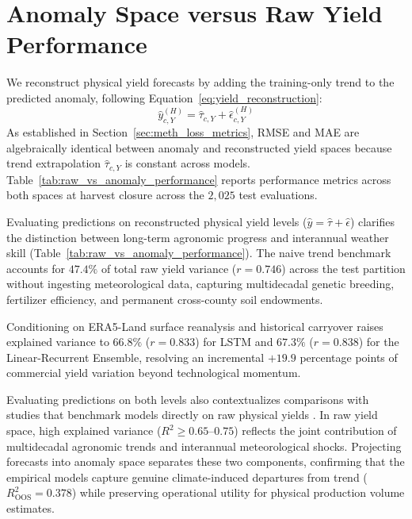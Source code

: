
\section{Anomaly Space versus Raw Yield Performance}
\label{sec:res_raw_vs_anomaly}

We reconstruct physical yield forecasts by adding the training-only trend to the predicted anomaly, following Equation~\eqref{eq:yield_reconstruction}:
\begin{equation}
    \hat{y}_{c,Y}^{(H)} = \hat{\tau}_{c,Y} + \hat{\epsilon}_{c,Y}^{(H)}
    \label{eq:level_projection}
\end{equation}
As established in Section~\ref{sec:meth_loss_metrics}, RMSE and MAE are algebraically identical between anomaly and reconstructed yield spaces because trend extrapolation $\hat{\tau}_{c,Y}$ is constant across models. Table~\ref{tab:raw_vs_anomaly_performance} reports performance metrics across both spaces at harvest closure across the $2{,}025$ test evaluations.



Evaluating predictions on reconstructed physical yield levels ($\hat{y} = \hat{\tau} + \hat{\epsilon}$) clarifies the distinction between long-term agronomic progress and interannual weather skill (Table~\ref{tab:raw_vs_anomaly_performance}). The naive trend benchmark accounts for $47.4\%$ of total raw yield variance ($r = 0.746$) across the test partition without ingesting meteorological data, capturing multidecadal genetic breeding, fertilizer efficiency, and permanent cross-county soil endowments.

Conditioning on ERA5-Land surface reanalysis and historical carryover raises explained variance to $66.8\%$ ($r = 0.833$) for LSTM and $67.3\%$ ($r = 0.838$) for the Linear-Recurrent Ensemble, resolving an incremental $+19.9$ percentage points of commercial yield variation beyond technological momentum.

Evaluating predictions on both levels also contextualizes comparisons with studies that benchmark models directly on raw physical yields \citep{ChenZhang2026, Khaki2020}. In raw yield space, high explained variance ($R^2 \ge 0.65$--$0.75$) reflects the joint contribution of multidecadal agronomic trends and interannual meteorological shocks. Projecting forecasts into anomaly space separates these two components, confirming that the empirical models capture genuine climate-induced departures from trend ($R^2_{\text{OOS}} = 0.378$) while preserving operational utility for physical production volume estimates.

